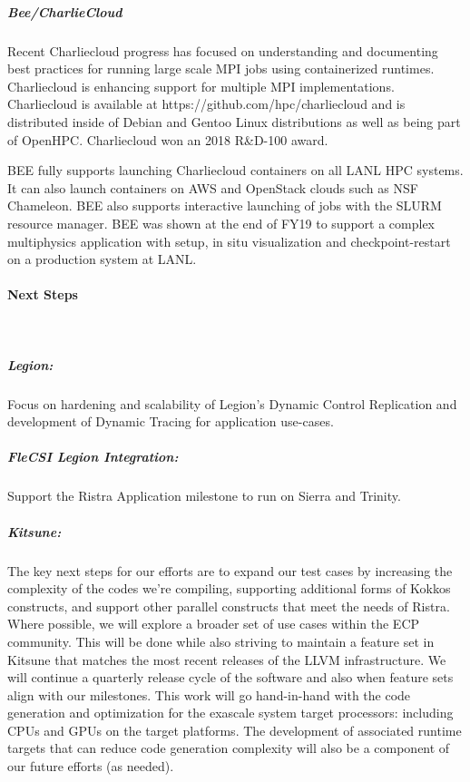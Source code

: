 \subparagraph{Bee/CharlieCloud}
%
Recent Charliecloud progress has focused on understanding and documenting best
practices for running large scale MPI jobs using containerized runtimes.
Charliecloud is enhancing support for multiple MPI implementations.
Charliecloud is available at https://github.com/hpc/charliecloud and is
distributed inside of Debian and Gentoo Linux distributions as well as being
part of OpenHPC.  Charliecloud won an 2018 R\&D-100 award.

BEE fully supports launching Charliecloud containers on all LANL HPC systems.
It can also launch containers on AWS and OpenStack clouds such as NSF
Chameleon.  BEE also supports interactive launching of jobs with the SLURM
resource manager. BEE was shown at the end of FY19 to support a complex multiphysics application with setup, in situ visualization and checkpoint-restart on a production system at LANL.

\paragraph{Next Steps} \leavevmode \\

\subparagraph{Legion:} 
Focus on hardening and scalability of Legion's Dynamic Control Replication and development of Dynamic Tracing for application use-cases. 

\subparagraph{FleCSI Legion Integration:} 
Support the Ristra Application milestone to run on Sierra and Trinity.

\subparagraph{Kitsune:}
The key next steps for our efforts are to expand our test cases by
increasing the complexity of the codes we're compiling, supporting
additional forms of Kokkos constructs, and support other parallel
constructs that meet the needs of Ristra.  Where possible, we will
explore a broader set of use cases within the ECP community.  This
will be done while also striving to maintain a feature set in Kitsune
that matches the most recent releases of the LLVM infrastructure. We
will continue a quarterly release cycle of the software and also when
feature sets align with our milestones.  This work will go
hand-in-hand with the code generation and optimization for the
exascale system target processors: including CPUs and GPUs on the
target platforms.  The development of associated runtime targets that
can reduce code generation complexity will also be a component of our
future efforts (as needed).

